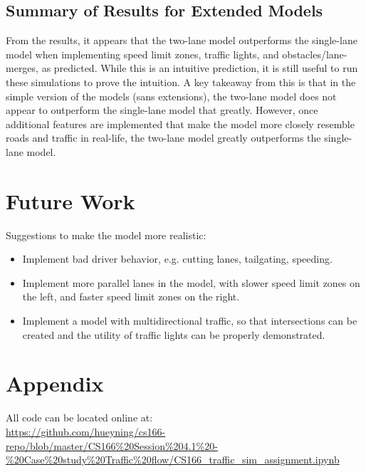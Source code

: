 \documentclass[11pt]{article}
\providecommand{\tightlist}{%
      \setlength{\itemsep}{0pt}\setlength{\parskip}{0pt}}
\begin{document}
    \subsection{Summary of Results for Extended Models}

From the results, it appears that the two-lane model outperforms the
single-lane model when implementing speed limit zones, traffic lights,
and obstacles/lane-merges, as predicted. While this is an intuitive
prediction, it is still useful to run these simulations to prove the
intuition. A key takeaway from this is that in the simple version of the
models (sans extensions), the two-lane model does not appear to
outperform the single-lane model that greatly. However, once additional
features are implemented that make the model more closely resemble roads
and traffic in real-life, the two-lane model greatly outperforms the
single-lane model.

\section{Future Work}

Suggestions to make the model more realistic:

\begin{itemize}
\tightlist
\item
  Implement bad driver behavior, e.g. cutting lanes, tailgating,
  speeding.
\item
  Implement more parallel lanes in the model, with slower speed limit
  zones on the left, and faster speed limit zones on the right.
\item
  Implement a model with multidirectional traffic, so that intersections
  can be created and the utility of traffic lights can be properly
  demonstrated.
\end{itemize}

\newpage
\section{Appendix}

All code can be located online at: \\

\url{https://github.com/hueyning/cs166-repo/blob/master/CS166%20Session%204.1%20-%20Case%20study%20Traffic%20flow/CS166_traffic_sim_assignment.ipynb}


    
    
    
    
\end{document}

